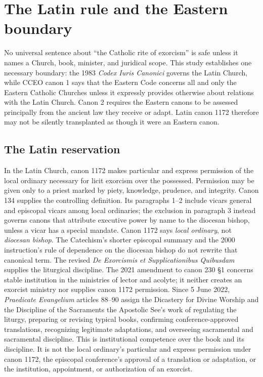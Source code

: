 \section{The Latin rule and the Eastern boundary}

No universal sentence about ``the Catholic rite of exorcism'' is safe unless
it names a Church, book, minister, and juridical scope. This study establishes
one necessary boundary: the 1983 \emph{Codex Iuris Canonici} governs the Latin
Church, while CCEO canon 1 says that the Eastern Code concerns all and only the
Eastern Catholic Churches unless it expressly provides otherwise about
relations with the Latin Church. Canon 2 requires the Eastern canons to be
assessed principally from the ancient law they receive or adapt. Latin canon
1172 therefore may not be silently transplanted as though it were an Eastern
canon.

\subsection{The Latin reservation}

In the Latin Church, canon 1172 makes particular and express permission of the
local ordinary necessary for licit exorcism over the possessed. Permission may
be given only to a priest marked by piety, knowledge, prudence, and integrity.
Canon 134 supplies the controlling definition. Its paragraphs 1--2 include
vicars general and episcopal vicars among local ordinaries; the exclusion in
paragraph 3 instead governs canons that attribute executive power by name to
the diocesan bishop, unless a vicar has a special mandate. Canon 1172 says
\emph{local ordinary}, not \emph{diocesan bishop}. The Catechism's shorter
episcopal summary and the 2000 instruction's rule of dependence on the
diocesan bishop do not rewrite that canonical term.
The revised \emph{De Exorcismis et Supplicationibus Quibusdam} supplies the
liturgical discipline. The 2021 amendment to canon 230 \S1 concerns stable
institution in the ministries of lector and acolyte; it neither creates an
exorcist ministry nor supplies canon 1172 permission. Since 5 June 2022,
\emph{Praedicate Evangelium}
articles 88--90 assign the Dicastery for Divine Worship and the Discipline of
the Sacraments the Apostolic See's work of regulating the liturgy, preparing
or revising typical books, confirming conference-approved translations,
recognizing legitimate adaptations, and overseeing sacramental and
sacramental discipline. This is institutional competence over the book and
its discipline. It is not the local ordinary's particular and express
permission under canon 1172, the episcopal conference's approval of a
translation or adaptation, or the institution, appointment, or authorization
of an exorcist.

